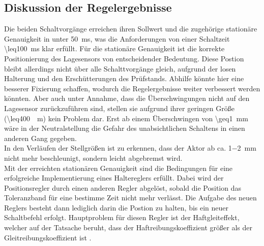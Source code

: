 \subsection{Diskussion der Regelergebnisse}\label{diskreg}
Die beiden Schaltvorgänge erreichen ihren Sollwert und die zugehörige stationäre Genauigkeit in unter \SI{50}{ms}, was die Anforderungen von einer Schaltzeit \SI{\leq100}{ms} klar erfüllt. Für die stationäre Genauigkeit ist die korrekte Positionierung des Lagesensors von entscheidender Bedeutung. Diese Postion bleibt allerdings nicht über alle Schalttvorgänge gleich, aufgrund der losen Halterung und den Erschütterungen des Prüfstands. Abhilfe könnte hier eine besserer Fixierung schaffen, wodurch die Regelergebnisse weiter verbessert werden könnten. Aber auch unter Annahme, dass die Überschwingungen nicht auf den Lagesensor zurückzuführen sind, stellen sie aufgrund ihrer geringen Größe (\SI{\leq400}{\mu m}) kein Problem dar. Erst ab einem Überschwingen von \SI{\geq1}{mm} wäre in der Neutralstellung die Gefahr des unabsichtlichen Schaltens in einen anderen Gang gegeben.\\
In den Verläufen der Stellgrößen ist zu erkennen, dass der Aktor ab ca. \SI{1-2}{mm} nicht mehr beschleunigt, sondern leicht abgebremst wird.\\
Mit der erreichten stationären Genauigkeit sind die Bedingungen für eine erfolgreiche Implementierung eines Haltereglers erfüllt. Dabei wird der Positionsregler durch einen anderen Regler abgelöst, sobald die Position das Toleranzband für eine bestimme Zeit nicht mehr verlässt. Die Aufgabe des neuen Reglers besteht dann lediglich darin die Postion zu halten, bis ein neuer Schaltbefehl erfolgt. Hauptproblem für diesen Regler ist der Haftgleiteffekt, welcher auf der Tatsache beruht, dass der Haftreibungskoeffizient größer als der Gleitreibungskoeffizient ist \cite{Bowden2001}. 

